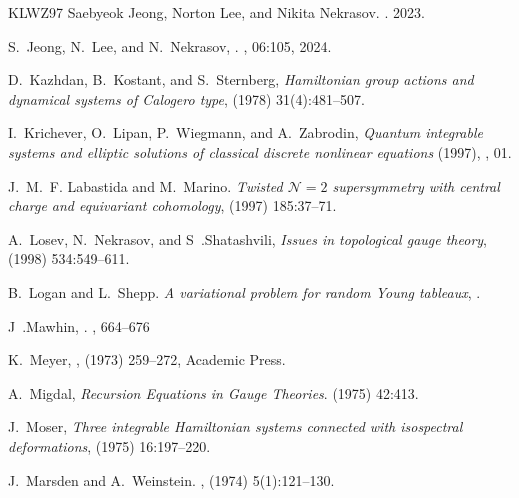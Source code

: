 \documentclass[12pt]{article}
\numberwithin{equation}{section}
\theoremstyle{definition}
\newcommand {\CalN} {\mathcal N}
\begin{document}
\begin{thebibliography}{KLWZ97}
Saebyeok Jeong, Norton Lee, and Nikita Nekrasov.
.
 2023.

S.~Jeong, N.~Lee, and N.~Nekrasov, 
.
, 06:105, 2024.

D.~Kazhdan, B.~Kostant, and S.~Sternberg, 
\emph{Hamiltonian group actions and dynamical systems of Calogero type}, 
 (1978) 31(4):481--507.

I.~Krichever, O.~Lipan, P.~Wiegmann, and A.~Zabrodin, 
\emph{Quantum integrable systems and elliptic solutions of classical
  discrete nonlinear equations} (1997), 
, 01.

J.~M.~F. Labastida and M.~Marino.
\emph{Twisted ${\CalN}=2$ supersymmetry with central charge and equivariant
  cohomology}, 
 (1997) 185:37--71.

A.~Losev, N.~Nekrasov, and S~.Shatashvili, 
\emph{Issues in topological gauge theory}, 
 (1998) 534:549--611.

B.~Logan and L.~Shepp.
\emph{A variational problem for random Young tableaux}, 
.

J~.Mawhin,
.
 ,  664--676

K.~Meyer, 
, 
 (1973) 259--272, 
  Academic Press.

A.~Migdal, 
\emph{Recursion Equations in Gauge Theories}.
 (1975) 42:413.

J.~Moser,
\emph{Three integrable Hamiltonian systems connected with isospectral
  deformations},
 (1975) 16:197--220.

J.~Marsden and A.~Weinstein.
,
 (1974)  5(1):121--130.


\end{thebibliography}
\end{document}
